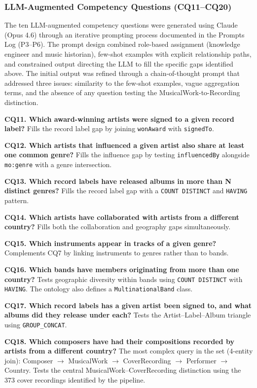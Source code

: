 \documentclass[11pt,a4paper]{article}
\begin{document}
\subsubsection{LLM-Augmented Competency Questions (CQ11--CQ20)}

The ten LLM-augmented competency questions were generated using Claude (Opus 4.6) through an iterative prompting process documented in the Prompts Log (P3--P6). The prompt design combined role-based assignment (knowledge engineer and music historian), few-shot examples with explicit relationship paths, and constrained output directing the LLM to fill the specific gaps identified above. The initial output was refined through a chain-of-thought prompt that addressed three issues: similarity to the few-shot examples, vague aggregation terms, and the absence of any question testing the MusicalWork-to-Recording distinction.

\textbf{CQ11. Which award-winning artists were signed to a given record label?} Fills the record label gap by joining \texttt{wonAward} with \texttt{signedTo}.

\textbf{CQ12. Which artists that influenced a given artist also share at least one common genre?} Fills the influence gap by testing \texttt{influencedBy} alongside \texttt{mo:genre} with a genre intersection.

\textbf{CQ13. Which record labels have released albums in more than N distinct genres?} Fills the record label gap with a \texttt{COUNT DISTINCT} and \texttt{HAVING} pattern.

\textbf{CQ14. Which artists have collaborated with artists from a different country?} Fills both the collaboration and geography gaps simultaneously.

\textbf{CQ15. Which instruments appear in tracks of a given genre?} Complements CQ7 by linking instruments to genres rather than to bands.

\textbf{CQ16. Which bands have members originating from more than one country?} Tests geographic diversity within bands using \texttt{COUNT DISTINCT} with \texttt{HAVING}. The ontology also defines a \texttt{MultinationalBand} class.

\textbf{CQ17. Which record labels has a given artist been signed to, and what albums did they release under each?} Tests the Artist--Label--Album triangle using \texttt{GROUP\_CONCAT}.

\textbf{CQ18. Which composers have had their compositions recorded by artists from a different country?} The most complex query in the set (4-entity join): Composer $\rightarrow$ MusicalWork $\rightarrow$ CoverRecording $\rightarrow$ Performer $\rightarrow$ Country. Tests the central MusicalWork--CoverRecording distinction using the 373 cover recordings identified by the pipeline.
\end{document}

